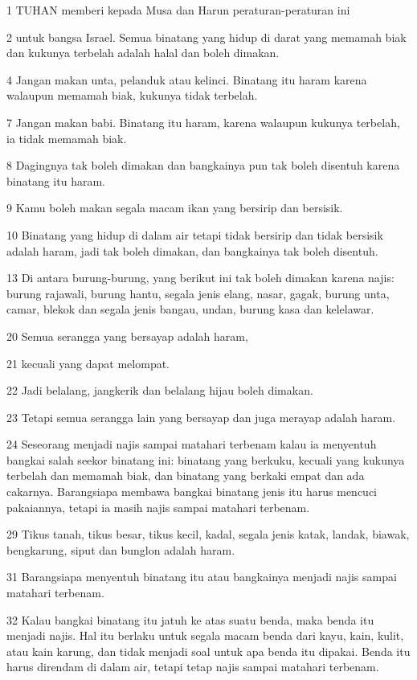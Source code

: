 \par 1 TUHAN memberi kepada Musa dan Harun peraturan-peraturan ini
\par 2 untuk bangsa Israel. Semua binatang yang hidup di darat yang memamah biak dan kukunya terbelah adalah halal dan boleh dimakan.
\par 4 Jangan makan unta, pelanduk atau kelinci. Binatang itu haram karena walaupun memamah biak, kukunya tidak terbelah.
\par 7 Jangan makan babi. Binatang itu haram, karena walaupun kukunya terbelah, ia tidak memamah biak.
\par 8 Dagingnya tak boleh dimakan dan bangkainya pun tak boleh disentuh karena binatang itu haram.
\par 9 Kamu boleh makan segala macam ikan yang bersirip dan bersisik.
\par 10 Binatang yang hidup di dalam air tetapi tidak bersirip dan tidak bersisik adalah haram, jadi tak boleh dimakan, dan bangkainya tak boleh disentuh.
\par 13 Di antara burung-burung, yang berikut ini tak boleh dimakan karena najis: burung rajawali, burung hantu, segala jenis elang, nasar, gagak, burung unta, camar, blekok dan segala jenis bangau, undan, burung kasa dan kelelawar.
\par 20 Semua serangga yang bersayap adalah haram,
\par 21 kecuali yang dapat melompat.
\par 22 Jadi belalang, jangkerik dan belalang hijau boleh dimakan.
\par 23 Tetapi semua serangga lain yang bersayap dan juga merayap adalah haram.
\par 24 Seseorang menjadi najis sampai matahari terbenam kalau ia menyentuh bangkai salah seekor binatang ini: binatang yang berkuku, kecuali yang kukunya terbelah dan memamah biak, dan binatang yang berkaki empat dan ada cakarnya. Barangsiapa membawa bangkai binatang jenis itu harus mencuci pakaiannya, tetapi ia masih najis sampai matahari terbenam.
\par 29 Tikus tanah, tikus besar, tikus kecil, kadal, segala jenis katak, landak, biawak, bengkarung, siput dan bunglon adalah haram.
\par 31 Barangsiapa menyentuh binatang itu atau bangkainya menjadi najis sampai matahari terbenam.
\par 32 Kalau bangkai binatang itu jatuh ke atas suatu benda, maka benda itu menjadi najis. Hal itu berlaku untuk segala macam benda dari kayu, kain, kulit, atau kain karung, dan tidak menjadi soal untuk apa benda itu dipakai. Benda itu harus direndam di dalam air, tetapi tetap najis sampai matahari terbenam.
